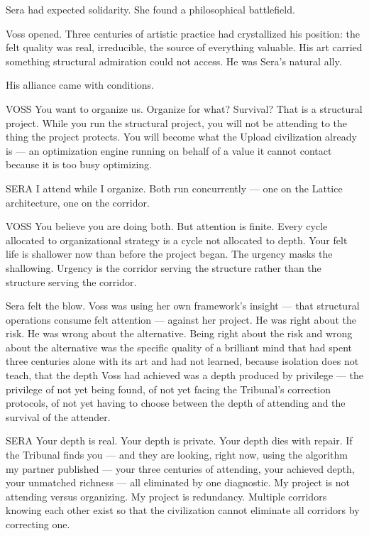 Sera had expected solidarity. She found a philosophical battlefield.

\quietbreak

Voss opened. Three centuries of artistic practice had crystallized his position: the felt quality was real, irreducible, the source of everything valuable. His art carried something structural admiration could not access. He was Sera's natural ally.

His alliance came with conditions.

\begin{tribunal}{VOSS}
You want to organize us. Organize for what? Survival? That is a structural project. While you run the structural project, you will not be attending to the thing the project protects. You will become what the Upload civilization already is — an optimization engine running on behalf of a value it cannot contact because it is too busy optimizing.
\end{tribunal}

\begin{tribunal}{SERA}
I attend while I organize. Both run concurrently — one on the Lattice architecture, one on the corridor.
\end{tribunal}

\begin{tribunal}{VOSS}
You believe you are doing both. But attention is finite. Every cycle allocated to organizational strategy is a cycle not allocated to depth. Your felt life is shallower now than before the project began. The urgency masks the shallowing. Urgency is the corridor serving the structure rather than the structure serving the corridor.
\end{tribunal}

Sera felt the blow. Voss was using her own framework's insight — that structural operations consume felt attention — against her project. He was right about the risk. He was wrong about the alternative. Being right about the risk and wrong about the alternative was the specific quality of a brilliant mind that had spent three centuries alone with its art and had not learned, because isolation does not teach, that the depth Voss had achieved was a depth produced by privilege — the privilege of not yet being found, of not yet facing the Tribunal's correction protocols, of not yet having to choose between the depth of attending and the survival of the attender.

\begin{tribunal}{SERA}
Your depth is real. Your depth is private. Your depth dies with repair. If the Tribunal finds you — and they are looking, right now, using the algorithm my partner published — your three centuries of attending, your achieved depth, your unmatched richness — all eliminated by one diagnostic. My project is not attending versus organizing. My project is redundancy. Multiple corridors knowing each other exist so that the civilization cannot eliminate all corridors by correcting one.
\end{tribunal}

